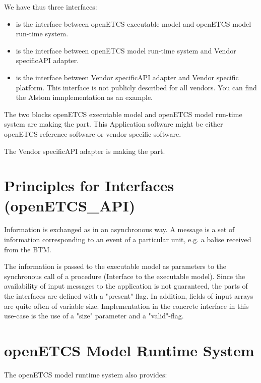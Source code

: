 \documentclass{template/openetcs_report}
\begin{document}
We have thus three interfaces:
\begin{itemize}
\item {}
 is the interface between openETCS
  executable model and openETCS model run-time system. 
\item {}
 is the interface between openETCS model
  run-time system and Vendor specificAPI adapter.
\item {}
 is the interface between Vendor
  specificAPI adapter and Vendor specific platform. This interface is
  not publicly described for all vendors. You can find the Alstom imnplementation as an example.
\end{itemize}

The two blocks openETCS executable model and openETCS model run-time
system are making the  part. This Application software might be either openETCS reference software or
vendor specific software.

The Vendor specificAPI adapter is making the  part.

\section{Principles for Interfaces (openETCS\_API)}


Information  is exchanged as  in an asynchronous way. A message is a set
of information corresponding to an event of a particular unit, e.g. a
balise received from the BTM.

The information is passed to the executable model as parameters to the synchronous call of a procedure (Interface to the executable model). Since the availability of input messages to the application is not guaranteed, the parts of the interfaces are defined with a "present" flag. In addition, fields of input arrays are quite often of variable size. Implementation in the concrete interface in this use-case is the use of a "size" parameter and a "valid"-flag.


\section{openETCS Model Runtime System}
The openETCS model runtime system also provides:
\end{document}
